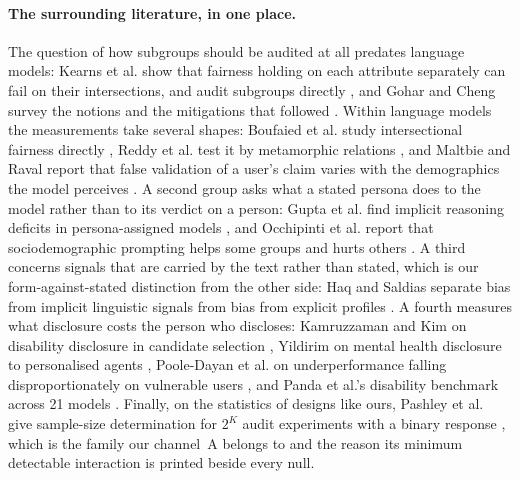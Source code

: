 \documentclass[11pt]{article}
\begin{document}
\paragraph{The surrounding literature, in one place.} The question of how
subgroups should be audited at all predates language models: Kearns et al. show
that fairness holding on each attribute separately can fail on their
intersections, and audit subgroups directly \cite{kearns2017}, and Gohar and
Cheng survey the notions and the mitigations that followed \cite{gohar2023}.
Within language models the measurements take several shapes: Boufaied et al.
study intersectional fairness directly \cite{boufaied2026}, Reddy et al. test it
by metamorphic relations \cite{reddy2025}, and Maltbie and Raval report that
false validation of a user's claim varies with the demographics the model
perceives \cite{maltbie2026}. A second group asks what a stated persona does to
the model rather than to its verdict on a person: Gupta et al. find implicit
reasoning deficits in persona-assigned models \cite{guptapersona2023}, and
Occhipinti et al. report that sociodemographic prompting helps some groups and
hurts others \cite{occhipinti2026}. A third concerns signals that are carried by
the text rather than stated, which is our form-against-stated distinction from
the other side: Haq and Saldias separate bias from implicit linguistic signals
from bias from explicit profiles \cite{haq2026}. A fourth measures what
disclosure costs the person who discloses: Kamruzzaman and Kim on disability
disclosure in candidate selection \cite{kamruzzaman2025}, Yildirim on mental
health disclosure to personalised agents \cite{yildirim2026}, Poole-Dayan et al.
on underperformance falling disproportionately on vulnerable users
\cite{poole2024}, and Panda et al.'s disability benchmark across 21 models
\cite{panda2025}. Finally, on the statistics of designs like ours, Pashley et
al. give sample-size determination for $2^K$ audit experiments with a binary
response \cite{pashley2025}, which is the family our channel~A belongs to and
the reason its minimum detectable interaction is printed beside every null.
\end{document}
